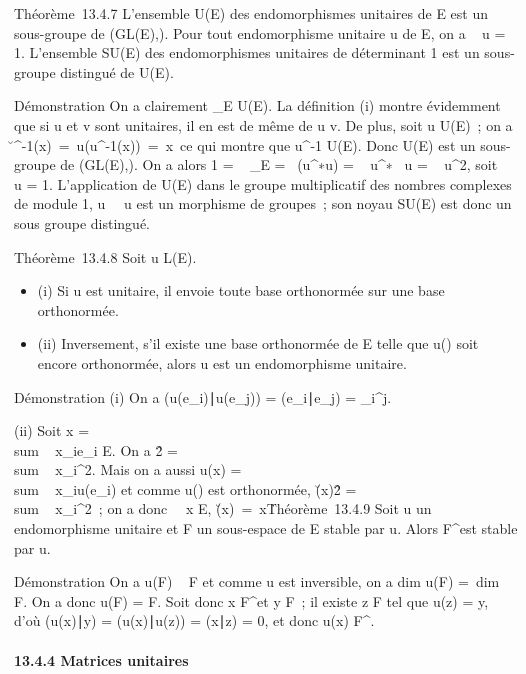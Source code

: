 \documentclass[]{article}
\begin{document}
Théorème~13.4.7 L'ensemble U(E) des endomorphismes unitaires de E est un
sous-groupe de (GL(E),\cdot). Pour tout endomorphisme unitaire u de E, on a
~
u = 1. L'ensemble SU(E) des endomorphismes unitaires de
déterminant 1 est un sous-groupe distingué de U(E).

Démonstration On a clairement \mathrmId_E \in
U(E). La définition (i) montre évidemment que si u et v sont unitaires,
il en est de même de u \cdot v. De plus, soit u \in U(E)~; on a
\u^-1(x)\
=\
u(u^-1(x))\
=\ x\ ce qui montre
que u^-1 \in U(E). Donc U(E) est un sous-groupe de (GL(E),\cdot).
On a alors 1 = ~
\mathrmId_E =\
 (u^∗\cdot u)
= ~
u^∗\mathrm{det}~ u
= ~
u^2, soit
\mathrm{det}~
u = 1. L'application de U(E) dans le groupe multiplicatif des
nombres complexes de module 1,
u\mapsto~\mathrm{det}~
u est un morphisme de groupes~; son noyau SU(E) est donc un sous groupe
distingué.

Théorème~13.4.8 Soit u \in L(E).

\begin{itemize}
\itemsep1pt\parskip0pt
\item
  (i) Si u est unitaire, il envoie toute base orthonormée sur une base
  orthonormée.
\item
  (ii) Inversement, s'il existe une base orthonormée  de E telle que
  u(\mathcal{E}) soit encore orthonormée, alors u est un endomorphisme unitaire.
\end{itemize}

Démonstration (i) On a
(u(e_i)∣u(e_j)) =
(e_i∣e_j) =
\delta_i^j.

(ii) Soit x = \\sum ~
x_ie_i \in E. On a
\x\^2
= \\sum ~
x_i^2. Mais on a aussi u(x)
= \\sum ~
x_iu(e_i) et comme u() est orthonormée,
\u(x)\^2
= \\sum ~
x_i^2~; on a donc
\forall~~x \in E,
\u(x)\
=\ x\.

Théorème~13.4.9 Soit u un endomorphisme unitaire et F un sous-espace de
E stable par u. Alors F^\bot est stable par u.

Démonstration On a u(F) \subset~ F et comme u est inversible, on a
dim u(F) =\ dim~ F. On
a donc u(F) = F. Soit donc x \in F^\bot et y \in F~; il existe z \in F
tel que u(z) = y, d'où (u(x)∣y) =
(u(x)∣u(z)) =
(x∣z) = 0, et donc u(x) \in F^\bot.

\paragraph{13.4.4 Matrices unitaires}
\end{document}

